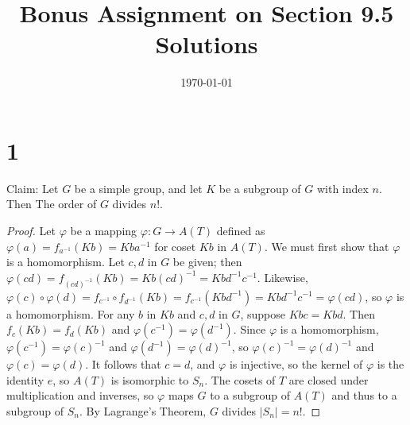 \documentclass{article}
\title{\textbf{Bonus Assignment on Section 9.5 Solutions}}
\date{}
\date\today
\begin{document}
\maketitle %

\thispagestyle{firstpage}
\section*{1}

Claim: Let $G$ be a simple group, and let $K$ be a subgroup of $G$ with index $n$.  Then 
The order of $G$ divides $n!$.

\begin{proof}
    Let $\varphi$ be a mapping $\varphi : G \rightarrow A(T)$ defined as 
    $\varphi(a) = f_{a^{-1}}(Kb) = Kba^{-1}$ for coset $Kb$ in $A(T)$.  We must first 
    show that $\varphi$ is a homomorphism.  Let $c, d$ in $G$ be given; then 
    $\varphi(cd) = f_{(cd)^{-1}}(Kb) = Kb(cd)^{-1} = Kbd^{-1}c^{-1}$.  Likewise, 
    $\varphi(c) \circ \varphi(d) = f_{c^{-1}} \circ f_{d^{-1}} (Kb) = f_{c^{-1}}(Kbd^{-1}) = Kbd^{-1}c^{-1} = \varphi(cd)$, 
    so $\varphi$ is a homomorphism.  For any $b$ in $Kb$ and $c, d$ in $G$, suppose 
    $Kbc = Kbd$.  Then $f_c(Kb) = f_d(Kb)$ and $\varphi(c^{-1}) = \varphi(d^{-1})$.  
    Since $\varphi$ is a homomorphism, $\varphi(c^{-1}) = \varphi(c)^{-1}$ and 
    $\varphi(d^{-1}) = \varphi(d)^{-1}$, so $\varphi(c)^{-1} = \varphi(d)^{-1}$ 
    and $\varphi(c) = \varphi(d)$.  It follows that $c = d$, and $\varphi$ is injective, 
    so the kernel of $\varphi$ is the identity $e$, so $A(T)$ is isomorphic to $S_n$.  
    The cosets of $T$ are closed under multiplication and inverses, so $\varphi$ 
    maps $G$ to a subgroup of $A(T)$ and thus to a subgroup of $S_n$.  By Lagrange's 
    Theorem, $G$ divides $|S_n| = n!$.
    
\end{proof}
\end{document}
